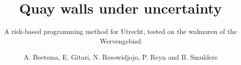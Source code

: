 \documentclass{tudelft-report}
\begin{document}
\frontmatter

\title{Quay walls under uncertainty}
\subtitle{A risk-based programming method for Utrecht, tested on the walmuren of the Wervengebied}
\author{A. Beetsma, E. Gitari, N. Resowidjojo, P. Reyn and B. Smulders}

\subject{CME4150 - Managing Uncertainty \& Data} %

\makecover



\tableofcontents



\mainmatter

%








\setcounter{biburlnumpenalty}{7000}
\setcounter{biburllcpenalty}{7000}
\setcounter{biburlucpenalty}{7000}

\printbibliography[heading=bibintoc,title=References]


\appendix






\end{document}
